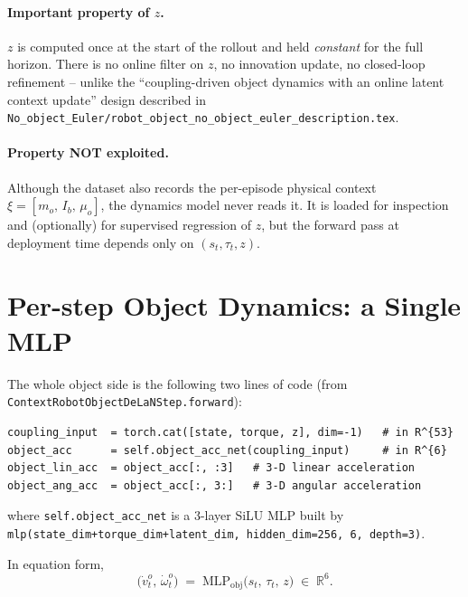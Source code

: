 \documentclass[11pt]{article}
\begin{document}
\paragraph{Important property of $z$.}
$z$ is computed once at the start of the rollout and held
\emph{constant} for the full horizon.  There is no online filter on
$z$, no innovation update, no closed-loop refinement -- unlike the
``coupling-driven object dynamics with an online latent context
update'' design described in
\texttt{No\_object\_Euler/robot\_object\_no\_object\_euler\_description.tex}.

\paragraph{Property NOT exploited.}
Although the dataset also records the per-episode physical context
$\xi = [m_o,\, I_b,\, \mu_o]$, the dynamics model never reads it.  It
is loaded for inspection and (optionally) for supervised regression of
$z$, but the forward pass at deployment time depends only on
$(s_t, \tau_t, z)$.

\section{Per-step Object Dynamics: a Single MLP}
\label{sec:cd-object}

The whole object side is the following two lines of code (from
\texttt{ContextRobotObjectDeLaNStep.forward}):
\begin{lstlisting}
coupling_input  = torch.cat([state, torque, z], dim=-1)   # in R^{53}
object_acc      = self.object_acc_net(coupling_input)     # in R^{6}
object_lin_acc  = object_acc[:, :3]   # 3-D linear acceleration
object_ang_acc  = object_acc[:, 3:]   # 3-D angular acceleration
\end{lstlisting}
where \texttt{self.object\_acc\_net} is a 3-layer SiLU MLP built by
\texttt{mlp(state\_dim+torque\_dim+latent\_dim, hidden\_dim=256, 6,
depth=3)}.

In equation form,
\begin{equation}
  \bigl(\dot v^o_t,\,\dot\omega^o_t\bigr)
  \;=\;
  \mathrm{MLP}_{\mathrm{obj}}\!\bigl(s_t,\,\tau_t,\,z\bigr)
  \;\in\;\mathbb{R}^{6}.
  \label{eq:cd-object-acc}
\end{equation}
\end{document}
